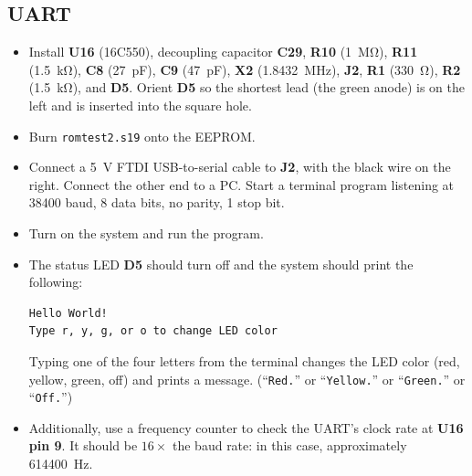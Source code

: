 \documentclass[letterpaper,11pt]{article}
\newcommand{\pin}[1]{\textbf{pin #1}}
\newcommand{\rpin}[2]{\refdes{#1} \pin{#2}}
\newcommand{\refdes}[1]{\textbf{#1}}
\newcommand{\kohm}[1]{\SI{#1}{\kilo\ohm}}
\newcommand{\Mohm}[1]{\SI{#1}{\mega\ohm}}
\newcommand{\pF}[1]{\SI{#1}{\pico\farad}}
\newcommand{\V}[1]{\SI{#1}{\volt}}
\newcommand{\MHz}[1]{\SI{#1}{\mega\hertz}}
\begin{document}
\subsection{UART}
\begin{itemize}
\item Install \refdes{U16} (16C550), decoupling capacitor \refdes{C29}, \refdes{R10} (\Mohm{1}), \refdes{R11} (\kohm{1.5}), \refdes{C8} (\pF{27}), \refdes{C9} (\pF{47}), \refdes{X2} (\MHz{1.8432}), \refdes{J2}, \refdes{R1} (\SI{330}{\ohm}), \refdes{R2} (\kohm{1.5}), and \refdes{D5}. Orient \refdes{D5} so the shortest lead (the green anode) is on the left and is inserted into the square hole.
\item Burn \texttt{romtest2.s19} onto the EEPROM.
\item Connect a \V{5} FTDI USB-to-serial cable to \refdes{J2}, with the black wire on the right. Connect the other end to a PC. Start a terminal program listening at 38400 baud, 8 data bits, no parity, 1 stop bit.
\item Turn on the system and run the program.
\item The status LED \refdes{D5} should turn off and the system should print the following:
\begin{verbatim}
Hello World!
Type r, y, g, or o to change LED color
\end{verbatim}
Typing one of the four letters from the terminal changes the LED color (red, yellow, green, off) and prints a message. (``\texttt{Red.}'' or ``\texttt{Yellow.}'' or ``\texttt{Green.}'' or ``\texttt{Off.}'')
\item Additionally, use a frequency counter to check the UART's clock rate at \rpin{U16}{9}. It should be $16\times$ the baud rate: in this case, approximately \SI{614400}{\hertz}.
\end{itemize}
\end{document}
